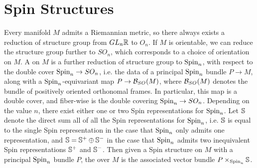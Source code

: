 %
\section{Spin Structures}
%
Every manifold $M$ admits a Riemannian metric, so there always exists a
reduction of structure group from $GL_n\R$ to $O_n$. If $M$ is orientable,
we can reduce the structure group further to $SO_n$, which corresponds to a
choice of orientation on $M$. A  on $M$
is a further reduction of structure group to $\Spin_n$, with respect to the
double cover $\Spin_n \to SO_n$, i.e. the data of a principal $\Spin_n$ bundle
$P \to M$, along with a $\Spin_n$-equivariant map $P \to \B_{SO}(M)$, where
$\B_{SO}(M)$ denotes the bundle of positively oriented orthonomal frames. In
particular, this map is a double cover, and fiber-wise is the double covering
$\Spin_n \to SO_n$.
Depending on the value $n$, there exist either one or two Spin representations
for $\Spin_n$. Let $\S$ denote the direct sum all of all the Spin representations
for $\Spin_n$, i.e. $\S$ is equal to the single Spin representation in the
case that $\Spin_n$ only admits one representation, and $\S = \S^+ \oplus \S^-$
in the case that $\Spin_n$ admits two inequivalent Spin representations $\S^+$
and $\S^-$. Then given a Spin structure on $M$ with a principal $\Spin_n$ bundle
$P$, the  over $M$ is the associated vector bundle
$P \times_{\Spin_n} \S$.
%
